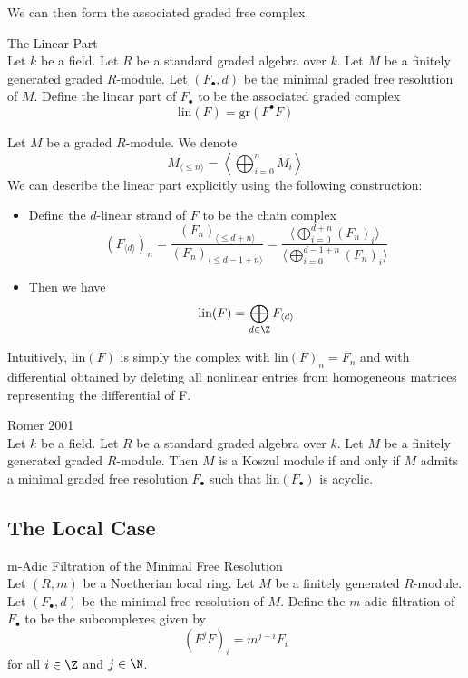 \documentclass[a4paper]{article}
\begin{document}
We can then form the associated graded free complex. 

\begin{defn}{The Linear Part}{}\\
Let $k$ be a field. Let $R$ be a standard graded algebra over $k$. Let $M$ be a finitely generated graded $R$-module. Let $(F_\bullet,d)$ be the minimal graded free resolution of $M$. Define the linear part of $F_\bullet$ to be the associated graded complex $$\text{lin}(F)=\text{gr}(F^\bullet F)$$
\end{defn}

Let $M$ be a graded $R$-module. We denote $$M_{\langle\leq n\rangle}=\left\langle\bigoplus_{i=0}^nM_i\right\rangle$$ We can describe the linear part explicitly using the following construction:
\begin{itemize}
\item Define the $d$-linear strand of $F$ to be the chain complex $$(F_{\langle d\rangle})_n=\frac{(F_n)_{\langle\leq d+n\rangle}}{(F_n)_{\langle\leq d-1+n\rangle}}=\frac{\langle\bigoplus_{i=0}^{d+n}(F_n)_i\rangle}{\langle\bigoplus_{i=0}^{d-1+n}(F_n)_i\rangle}$$
\item Then we have $$\text{lin}(F)=\bigoplus_{d\in\Z}F_{\langle d\rangle}$$
\end{itemize}
Intuitively, $\text{lin}(F)$ is simply the complex with $\text{lin}(F)_n=F_n$ and with differential obtained by deleting all nonlinear entries from homogeneous matrices representing the differential of F.

\begin{thm}{Romer 2001}{}\\
Let $k$ be a field. Let $R$ be a standard graded algebra over $k$. Let $M$ be a finitely generated graded $R$-module. Then $M$ is a Koszul module if and only if $M$ admits a minimal graded free resolution $F_\bullet$ such that $\text{lin}(F_\bullet)$ is acyclic. 
\end{thm}

\subsection{The Local Case}
\begin{defn}{m-Adic Filtration of the Minimal Free Resolution}{}\\
Let $(R,m)$ be a Noetherian local ring. Let $M$ be a finitely generated $R$-module. Let $(F_\bullet,d)$ be the minimal free resolution of $M$. Define the $m$-adic filtration of $F_\bullet$ to be the subcomplexes given by $$(F^jF)_i=m^{j-i}F_i$$ for all $i\in\Z$ and $j\in\N$. 
\end{defn}
\end{document}
